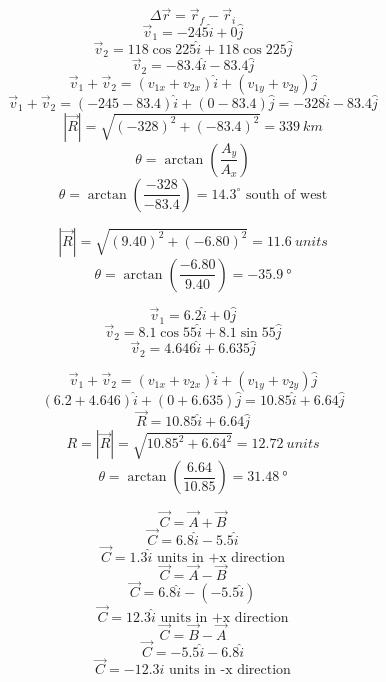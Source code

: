 \documentclass[11pt]{homework}
\begin{document}
\maketitle

\renewcommand{\questiontype}{Problem}
\setcounter{questionCounter}{0}

\question
\[
\Delta \vec{r}=\vec{r}_{f}-\vec{r}_{i}
\]\[
\vec{v}_1 = -245\hat{i} + 0\hat{j}
\]\[
\vec{v}_2=118 \cos 225\hat{i}+118 \cos 225\hat{j}
\] \[
\vec{v}_2=-83.4\hat{i}-83.4\hat{j}
\] \[
\vec{v}_{1}+\vec{v}_{2}=(v_{1x}+v_{2x})\hat{i}+(v_{1y}+v_{2y})\hat{j}
\] \[
\vec{v}_{1}+\vec{v}_{2}=(-245-83.4)\hat{i}+(0-83.4)\hat{j} = -328\hat{i}-83.4\hat{j}
\] \[
|\vec R| = \sqrt{(-328)^2+(-83.4)^2} = \boxed{\qty{339}{km}}
\] \[
\theta=\arctan\left( \frac{A_{y}}{A_{x}} \right)
\] 
\[
    \theta= \arctan\left(\frac{-328}{-83.4}\right) =\boxed{14.3^{\circ}\mbox{ south of west}}
\] 
\centering
{}

           
\setcounter{questionCounter}{2}
\question
\[
|\vec{R}| = \sqrt{(9.40)^2+(-6.80)^2}= \boxed{\qty{11.6}{units}} 
\]\[
\theta = \arctan \left( \frac{-6.80}{9.40} \right) = \boxed{\qty{-35.9}{\degree}}
\] 
 
\setcounter{questionCounter}{5}
\question
\begin{alphaparts}
\questionpart
\[
\vec{v}_{1}=6.2\hat{i}+0\hat{j}
\] \[
\vec{v}_{2}=8.1\cos 55 \hat{i} + 8.1\sin 55 \hat{j}
\] \[
\vec{v}_{2}=4.646\hat{i}+6.635\hat{j}
\]

\questionpart
\[
\vec{v}_{1}+\vec{v}_{2}=(v_{1x}+v_{2x})\hat{i}+(v_{1y}+v_{2y})\hat{j}
\]
\[
(6.2+4.646)\hat{i}+(0+6.635)\hat{j} = 10.85\hat{i}+6.64\hat{j}
\]
\[\vec{R}=10.85\hat{i}+6.64\hat{j}\]
\[
    R=|\vec{R}|=\sqrt{ 10.85^2+6.64^2 }=\boxed{\qty{12.72}{units}}
    \]\[
    \theta=\arctan\left( \frac{6.64}{10.85} \right)=\boxed{\qty{31.48}{\degree}}
\]
\end{alphaparts} 
\question
\begin{alphaparts}
    \questionpart
    \[
        \vec{C}=\vec{A}+\vec{B}
    \] \[
        \vec{C}=6.8\hat{i}-5.5\hat{i}
    \] \[
    \vec{C}=1.3\hat{i} \mbox{ units in +x direction}
    \] 
    \questionpart \[
        \vec{C}=\vec{A}-\vec{B}
    \] \[
    \vec{C}=6.8\hat{i}-(-5.5\hat{i})
    \] \[
    \vec{C}=12.3\hat{i}\mbox{ units in +x direction}
    \] 
    \questionpart \[
        \vec{C}=\vec{B}-\vec{A}
    \] \[
    \vec{C}=-5.5\hat{i}-6.8\hat{i}
    \] \[
\vec{C}=-12.3\hat{i}\mbox{ units in -x direction}\]
\end{alphaparts}
\end{document}
